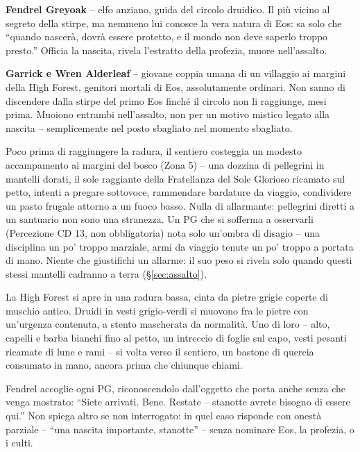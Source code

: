 \DndSetAreaOptions[region={Zona~}]

\textbf{Fendrel Greyoak} -- elfo anziano, guida del circolo druidico. Il più vicino al segreto della stirpe, ma nemmeno lui conosce la vera natura di Eos: sa solo che ``quando nascerà, dovrà essere protetto, e il mondo non deve saperlo troppo presto.'' Officia la nascita, rivela l'estratto della profezia, muore nell'assalto.

\textbf{Garrick e Wren Alderleaf} -- giovane coppia umana di un villaggio ai margini della High Forest, genitori mortali di Eos, assolutamente ordinari. Non sanno di discendere dalla stirpe del primo Eos finché il circolo non li raggiunge, mesi prima. Muoiono entrambi nell'assalto, non per un motivo mistico legato alla nascita -- semplicemente nel posto sbagliato nel momento sbagliato.


Poco prima di raggiungere la radura, il sentiero costeggia un modesto accampamento ai margini del bosco (Zona 5) -- una dozzina di pellegrini in mantelli dorati, il sole raggiante della Fratellanza del Sole Glorioso ricamato sul petto, intenti a pregare sottovoce, rammendare bardature da viaggio, condividere un pasto frugale attorno a un fuoco basso. Nulla di allarmante: pellegrini diretti a un santuario non sono una stranezza. Un PG che si sofferma a osservarli (Percezione CD 13, non obbligatoria) nota solo un'ombra di disagio -- una disciplina un po' troppo marziale, armi da viaggio tenute un po' troppo a portata di mano. Niente che giustifichi un allarme: il suo peso si rivela solo quando questi stessi mantelli cadranno a terra (\S\ref{sec:assalto}).

\begin{DndReadAloud}[]
  La High Forest si apre in una radura bassa, cinta da pietre grigie coperte di muschio antico. Druidi in vesti grigio-verdi si muovono fra le pietre con un'urgenza contenuta, a stento mascherata da normalità. Uno di loro -- alto, capelli e barba bianchi fino al petto, un intreccio di foglie sul capo, vesti pesanti ricamate di lune e rami -- si volta verso il sentiero, un bastone di quercia consumato in mano, ancora prima che chiunque chiami.
\end{DndReadAloud}

Fendrel accoglie ogni PG, riconoscendolo dall'oggetto che porta anche senza che venga mostrato: ``Siete arrivati. Bene. Restate -- stanotte avrete bisogno di essere qui.'' Non spiega altro se non interrogato: in quel caso risponde con onestà parziale -- ``una nascita importante, stanotte'' -- senza nominare Eos, la profezia, o i culti.


